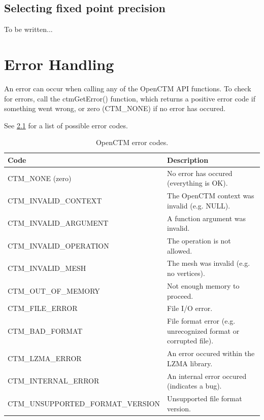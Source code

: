 \section{Selecting fixed point precision}
To be written...




\chapter{Error Handling}
An error can occur when calling any of the OpenCTM API functions. To check
for errors, call the ctmGetError() function, which returns a positive error
code if something went wrong, or zero (CTM\_NONE) if no error has occured.

See \ref{tab:ErrorCodes} for a list of possible error codes.

\begin{table}[p]
\centering
\begin{tabular}{|l|p{7cm}|}\hline
\textbf{Code} & \textbf{Description}\\ \hline
CTM\_NONE (zero) & No error has occured (everything is OK).\\ \hline
CTM\_INVALID\_CONTEXT & The OpenCTM context was invalid (e.g. NULL).\\ \hline
CTM\_INVALID\_ARGUMENT & A function argument was invalid.\\ \hline
CTM\_INVALID\_OPERATION & The operation is not allowed.\\ \hline
CTM\_INVALID\_MESH & The mesh was invalid (e.g. no vertices).\\ \hline
CTM\_OUT\_OF\_MEMORY & Not enough memory to proceed.\\ \hline
CTM\_FILE\_ERROR & File I/O error.\\ \hline
CTM\_BAD\_FORMAT & File format error (e.g. unrecognized format or corrupted file).\\ \hline
CTM\_LZMA\_ERROR & An error occured within the LZMA library.\\ \hline
CTM\_INTERNAL\_ERROR & An internal error occured (indicates a bug).\\ \hline
CTM\_UNSUPPORTED\_FORMAT\_VERSION & Unsupported file format version.\\ \hline
\end{tabular}
\caption{OpenCTM error codes.}
\label{tab:ErrorCodes}
\end{table}


